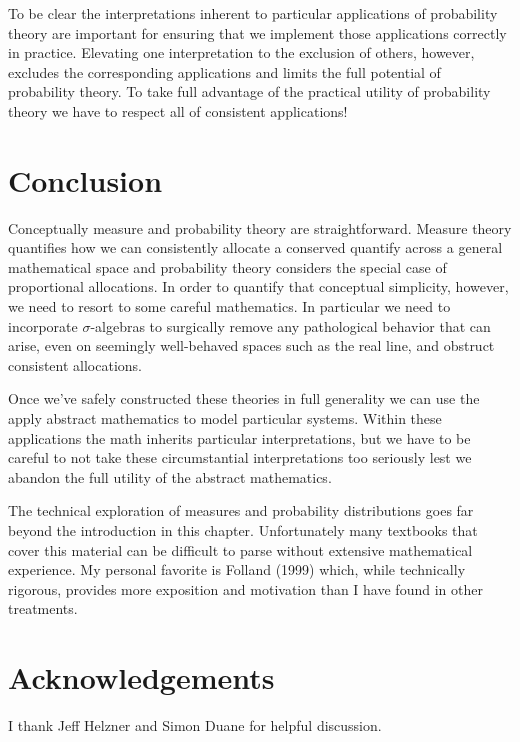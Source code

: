 \documentclass[
  letterpaper,
  DIV=11,
  numbers=noendperiod]{scrartcl}
\begin{document}
To be clear the interpretations inherent to particular applications of
probability theory are important for ensuring that we implement those
applications correctly in practice. Elevating one interpretation to the
exclusion of others, however, excludes the corresponding applications
and limits the full potential of probability theory. To take full
advantage of the practical utility of probability theory we have to
respect all of consistent applications!

\hypertarget{conclusion}{%
\section{Conclusion}\label{conclusion}}

Conceptually measure and probability theory are straightforward. Measure
theory quantifies how we can consistently allocate a conserved quantify
across a general mathematical space and probability theory considers the
special case of proportional allocations. In order to quantify that
conceptual simplicity, however, we need to resort to some careful
mathematics. In particular we need to incorporate \(\sigma\)-algebras to
surgically remove any pathological behavior that can arise, even on
seemingly well-behaved spaces such as the real line, and obstruct
consistent allocations.

Once we've safely constructed these theories in full generality we can
use the apply abstract mathematics to model particular systems. Within
these applications the math inherits particular interpretations, but we
have to be careful to not take these circumstantial interpretations too
seriously lest we abandon the full utility of the abstract mathematics.

The technical exploration of measures and probability distributions goes
far beyond the introduction in this chapter. Unfortunately many
textbooks that cover this material can be difficult to parse without
extensive mathematical experience. My personal favorite is Folland
(1999) which, while technically rigorous, provides more exposition and
motivation than I have found in other treatments.

\hypertarget{acknowledgements}{%
\section{Acknowledgements}\label{acknowledgements}}

I thank Jeff Helzner and Simon Duane for helpful discussion.
\end{document}
